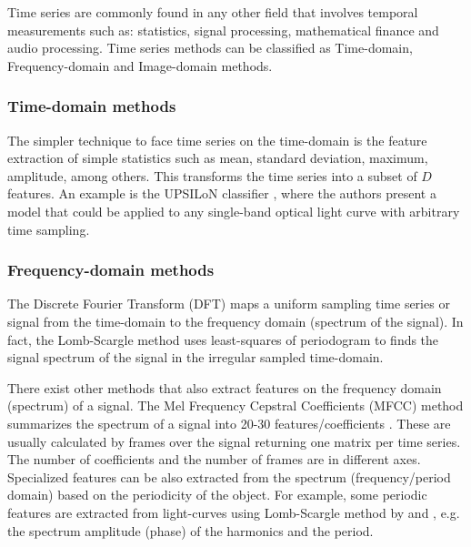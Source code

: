 Time series are commonly found in any other field that involves temporal measurements such as: statistics, signal processing, mathematical finance and audio processing. %
Time series methods can be classified as Time-domain, Frequency-domain and Image-domain methods.

\subsubsection{Time-domain methods}
The simpler technique to face time series on the time-domain is the feature extraction of simple statistics such as mean, standard deviation, maximum, amplitude, among others. This transforms the time series into a subset of $D$ features. An example is the UPSILoN classifier \citep{kim2016package}, where the authors present a model that could be applied to any single-band optical light curve with arbitrary time sampling. %


\subsubsection{Frequency-domain methods}
The Discrete Fourier Transform (DFT) \citep{cooley1969fast} maps a uniform sampling time series or signal from the time-domain to the frequency domain (spectrum of the signal). In fact, the Lomb-Scargle method \citep{lomb1976least} uses least-squares of periodogram to finds the signal spectrum of the signal in the irregular sampled time-domain. %

There exist other methods that also extract features on the frequency domain (spectrum) of a signal. The Mel Frequency Cepstral Coefficients (MFCC) method summarizes the spectrum of a signal into 20-30 features/coefficients \citep{zheng2001comparison}. These are usually calculated by frames over the signal returning one matrix per time series. The number of coefficients and the number of frames are in different axes.
Specialized features can be also extracted from the spectrum (frequency/period domain) based on the periodicity of the object. For example, some periodic features are extracted from light-curves using Lomb-Scargle method by \citep{richards2011machine} and \citep{cabral2018fats}, e.g. the spectrum amplitude (phase) of the harmonics and the period.


